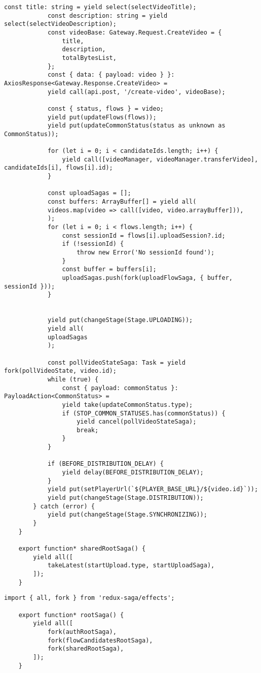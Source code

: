 \begin{lstlisting}[caption={shared/sagas.ts}]
			const title: string = yield select(selectVideoTitle);
			const description: string = yield select(selectVideoDescription);
			const videoBase: Gateway.Request.CreateVideo = {
				title,
				description,
				totalBytesList,
			};
			const { data: { payload: video } }: AxiosResponse<Gateway.Response.CreateVideo> =
			yield call(api.post, '/create-video', videoBase);
			
			const { status, flows } = video;
			yield put(updateFlows(flows));
			yield put(updateCommonStatus(status as unknown as CommonStatus));
			
			for (let i = 0; i < candidateIds.length; i++) {
				yield call([videoManager, videoManager.transferVideo], candidateIds[i], flows[i].id);
			}
			
			const uploadSagas = [];
			const buffers: ArrayBuffer[] = yield all(
			videos.map(video => call([video, video.arrayBuffer])),
			);
			for (let i = 0; i < flows.length; i++) {
				const sessionId = flows[i].uploadSession?.id;
				if (!sessionId) {
					throw new Error('No sessionId found');
				}
				const buffer = buffers[i];
				uploadSagas.push(fork(uploadFlowSaga, { buffer, sessionId }));
			}
			
			
			yield put(changeStage(Stage.UPLOADING));
			yield all(
			uploadSagas
			);
			
			const pollVideoStateSaga: Task = yield fork(pollVideoState, video.id);
			while (true) {
				const { payload: commonStatus }: PayloadAction<CommonStatus> =
				yield take(updateCommonStatus.type);
				if (STOP_COMMON_STATUSES.has(commonStatus)) {
					yield cancel(pollVideoStateSaga);
					break;
				}
			}
			
			if (BEFORE_DISTRIBUTION_DELAY) {
				yield delay(BEFORE_DISTRIBUTION_DELAY);
			}
			yield put(setPlayerUrl(`${PLAYER_BASE_URL}/${video.id}`));
			yield put(changeStage(Stage.DISTRIBUTION));
		} catch (error) {
			yield put(changeStage(Stage.SYNCHRONIZING));
		}
	}
	
	export function* sharedRootSaga() {
		yield all([
			takeLatest(startUpload.type, startUploadSaga),
		]);
	}
\end{lstlisting}

\begin{lstlisting}[caption={root-saga.ts}]
	import { all, fork } from 'redux-saga/effects';
	
	export function* rootSaga() {
		yield all([
			fork(authRootSaga),
			fork(flowCandidatesRootSaga),
			fork(sharedRootSaga),
		]);
	}
\end{lstlisting}

